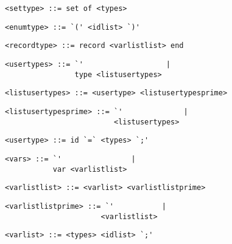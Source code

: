 \begin{footnotesize}
\begin{lstlisting}[frame=single, label={settype}, language=pie]
<settype> ::= set of <types>
\end{lstlisting}

\begin{lstlisting}[frame=single, label={enumtype}, language=pie]
<enumtype> ::= `(' <idlist> `)'
\end{lstlisting}

\begin{lstlisting}[frame=single, label={recordtype}, language=pie]
<recordtype> ::= record <varlistlist> end
\end{lstlisting}

\begin{lstlisting}[frame=single, label={usertypes}]
<usertypes> ::= `'                   |
                type <listusertypes>
\end{lstlisting}

\begin{lstlisting}[frame=single, label={listusertypes}]
<listusertypes> ::= <usertype> <listusertypesprime>
\end{lstlisting}

\begin{lstlisting}[frame=single, label={listusertypesprime}]
<listusertypesprime> ::= `'              |
                         <listusertypes>
\end{lstlisting}

\begin{lstlisting}[frame=single, label={usertype}]
<usertype> ::= id `=` <types> `;'
\end{lstlisting}

\begin{lstlisting}[frame=single, label={vars}, language=pie]
<vars> ::= `'                |
           var <varlistlist>
\end{lstlisting}

\begin{lstlisting}[frame=single, label={varlistlist}, language=pie]
<varlistlist> ::= <varlist> <varlistlistprime>
\end{lstlisting}

\begin{lstlisting}[frame=single, label={varlistlistprime}, language=pie]
<varlistlistprime> ::= `'           |
                      <varlistlist>
\end{lstlisting}

\begin{lstlisting}[frame=single, label={varlist}, language=pie]
<varlist> ::= <types> <idlist> `;'
\end{lstlisting}


\end{footnotesize}
